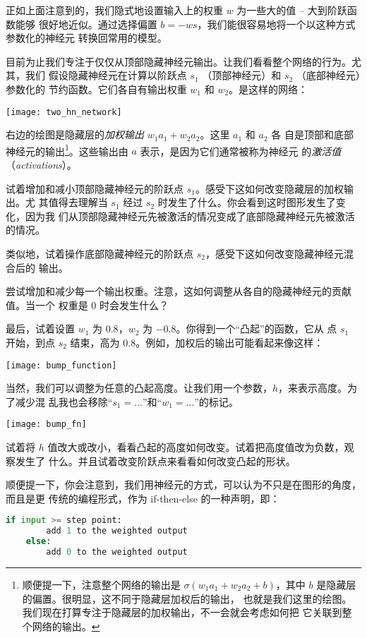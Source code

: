 正如上面注意到的，我们隐式地设置输入上的权重 $w$ 为一些大的值 -- 大到阶跃函数能够
很好地近似。通过选择偏置 $b = -ws$，我们能很容易地将一个以这种方式参数化的神经元
转换回常用的模型。

目前为止我们专注于仅仅从顶部隐藏神经元输出。让我们看看整个网络的行为。尤其，我们
假设隐藏神经元在计算以阶跃点 $s_1$ （顶部神经元）和 $s_2$ （底部神经元）参数化的
节约函数。它们各自有输出权重 $w_1$ 和 $w_2$。是这样的网络：
\begin{center}
  \texttt{[image: two\_hn\_network]}
\end{center}

右边的绘图是隐藏层的\emph{加权输出} $w_1 a_1 + w_2 a_2$。这里 $a_1$ 和 $a_2$ 各
自是顶部和底部神经元的输出\footnote{顺便提一下，注意整个网络的输出是 $\sigma(w_1
  a_1+w_2 a_2 + b)$，其中 $b$ 是隐藏层的偏置。很明显，这不同于隐藏层加权后的输出，
  也就是我们这里的绘图。我们现在打算专注于隐藏层的加权输出，不一会就会考虑如何把
  它关联到整个网络的输出。}。这些输出由 $a$ 表示，是因为它们通常被称为神经元
的\emph{激活值}（\textit{activations}）。

试着增加和减小顶部隐藏神经元的阶跃点 $s_1$。感受下这如何改变隐藏层的加权输出。尤
其值得去理解当 $s_1$ 经过 $s_2$ 时发生了什么。你会看到这时图形发生了变化，因为我
们从顶部隐藏神经元先被激活的情况变成了底部隐藏神经元先被激活的情况。

类似地，试着操作底部隐藏神经元的阶跃点 $s_2$，感受下这如何改变隐藏神经元混合后的
输出。

尝试增加和减少每一个输出权重。注意，这如何调整从各自的隐藏神经元的贡献值。当一个
权重是 0 时会发生什么？

最后，试着设置 $w_1$ 为 $0.8$，$w_2$ 为 $-0.8$。你得到一个“凸起”的函数，它从
点 $s_1$ 开始，到点 $s_2$ 结束，高为 $0.8$。例如，加权后的输出可能看起来像这样：
\begin{center}
  \texttt{[image: bump\_function]}
\end{center}

当然，我们可以调整为任意的凸起高度。让我们用一个参数，$h$，来表示高度。为了减少混
乱我也会移除“$s_1 = \ldots$”和“$w_1 = \ldots$”的标记。
\begin{center}
  \texttt{[image: bump\_fn]}
\end{center}

试着将 $h$ 值改大或改小，看看凸起的高度如何改变。试着把高度值改为负数，观察发生了
什么。并且试着改变阶跃点来看看如何改变凸起的形状。

顺便提一下，你会注意到，我们用神经元的方式，可以认为不只是在图形的角度，而且是更
传统的编程形式，作为 {\serif if-then-else} 的一种声明，即：
\begin{lstlisting}[language=Python]
    if input >= step point:
        add 1 to the weighted output
    else:
        add 0 to the weighted output  
\end{lstlisting}

